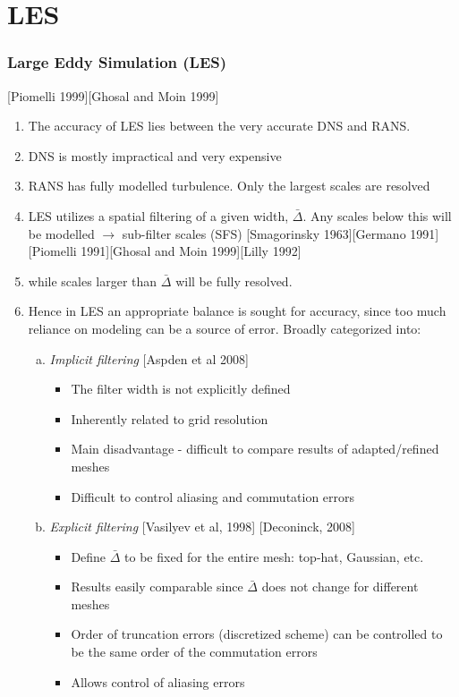 \documentclass{beamer}
\begin{document}
\section{LES}
\begin{frame}
\frametitle{Large Eddy Simulation (LES)}
\scriptsize
\begin{minipage}[t][1\textheight]{1\textwidth}
[Piomelli 1999][Ghosal and Moin 1999]
\begin{enumerate}[1.]
\setlength\itemsep{0.3em}
\item The accuracy of LES lies between the very accurate DNS and RANS.
\item DNS is mostly impractical and very expensive
\item RANS has fully modelled turbulence. Only the largest scales are resolved
\item LES utilizes a spatial filtering of a given width, $\bar{\Delta} $. Any scales below this will be modelled $\rightarrow$ sub-filter scales (SFS) [Smagorinsky 1963][Germano 1991][Piomelli 1991][Ghosal and Moin 1999][Lilly 1992]
\item while scales larger than $\bar{\Delta}$ will be fully resolved.
\item Hence in LES an appropriate balance is sought for accuracy, since too much reliance on modeling can be a source of error. Broadly categorized into:\par
\begin{enumerate}[(a)]
\tiny
\vspace{-2pt}
\item \scriptsize{\textit{Implicit filtering} [Aspden et al 2008]}
\begin{itemize}
\tiny
\item The filter width is not explicitly defined
\item Inherently related to grid resolution
\item Main disadvantage - difficult to compare results of adapted/refined meshes
\item Difficult to control aliasing and commutation errors
\end{itemize}

\vspace{-2pt}
\item \scriptsize{\textit{Explicit filtering} [Vasilyev et al, 1998] [Deconinck, 2008]}
\begin{itemize}
\tiny
\item Define $\bar{\Delta} $ to be fixed for the entire mesh: top-hat, Gaussian, etc.
\item Results easily comparable since $\bar{\Delta} $ does not change for different meshes
\item Order of truncation errors (discretized scheme) can be controlled to be the same order of the commutation errors
\item Allows control of aliasing errors
\end{itemize}

\end{enumerate}

\end{enumerate}
\end{minipage}

\end{frame}
\end{document}
